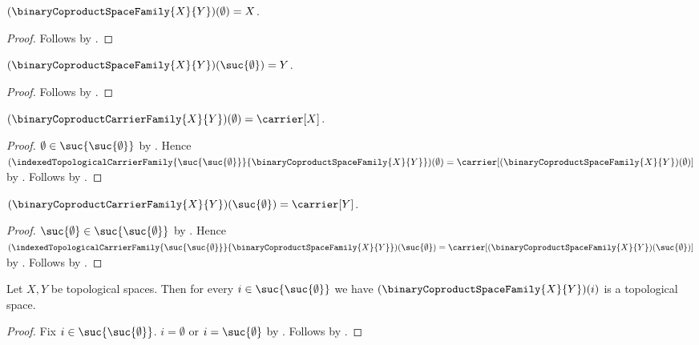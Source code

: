 \begin{proposition}\label{binary_coproduct_space_family_left}
    $(\binaryCoproductSpaceFamily{X}{Y})(\emptyset)=X$.
\end{proposition}
\begin{proof}
    Follows by
        .
\end{proof}

\begin{proposition}\label{binary_coproduct_space_family_right}
    $(\binaryCoproductSpaceFamily{X}{Y})(\suc{\emptyset})=Y$.
\end{proposition}
\begin{proof}
    Follows by
        .
\end{proof}

\begin{proposition}\label{binary_coproduct_carrier_family_left}
    $(\binaryCoproductCarrierFamily{X}{Y})(\emptyset)=\carrier[X]$.
\end{proposition}
\begin{proof}
    $\emptyset\in\suc{\suc{\emptyset}}$ by
        .
    Hence $(\indexedTopologicalCarrierFamily{
        \suc{\suc{\emptyset}}}{
        \binaryCoproductSpaceFamily{X}{Y}})(\emptyset)
        =\carrier[(\binaryCoproductSpaceFamily{X}{Y})(\emptyset)]$ by
        .
    Follows by
        .
\end{proof}

\begin{proposition}\label{binary_coproduct_carrier_family_right}
    $(\binaryCoproductCarrierFamily{X}{Y})(\suc{\emptyset})
        =\carrier[Y]$.
\end{proposition}
\begin{proof}
    $\suc{\emptyset}\in\suc{\suc{\emptyset}}$ by .
    Hence $(\indexedTopologicalCarrierFamily{
        \suc{\suc{\emptyset}}}{
        \binaryCoproductSpaceFamily{X}{Y}})(\suc{\emptyset})
        =\carrier[(\binaryCoproductSpaceFamily{X}{Y})(
            \suc{\emptyset})]$ by
        .
    Follows by
        .
\end{proof}

\begin{proposition}\label{binary_coproduct_family_is_topological}
    Let $X,Y$ be topological spaces.
    Then for every $i\in\suc{\suc{\emptyset}}$ we have
        $(\binaryCoproductSpaceFamily{X}{Y})(i)$ is a topological space.
\end{proposition}
\begin{proof}
    Fix $i\in\suc{\suc{\emptyset}}$.
    $i=\emptyset$ or $i=\suc{\emptyset}$ by
        .
    Follows by
        .
\end{proof}

